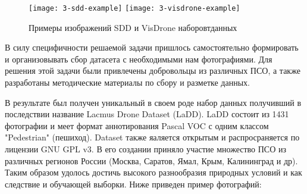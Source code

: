 \begin{figure}[H]
    \centering
    \texttt{[image: 3-sdd-example]}
    \hfill
    \texttt{[image: 3-visdrone-example]}
    \caption{Примеры изображений SDD и VisDrone наборовтданных} \label{sdd-visdrone-example}
\end{figure}


В силу специфичности решаемой задачи пришлось самостоятельно формировать и организовывать сбор датасета с необходимыми нам фотографиями. Для решения этой задачи были привлечены добровольцы из различных ПСО, а также разработаны методические материалы по сбору и разметке данных.

В результате был получен уникальный в своем роде набор данных получивший в последствии название Lacmus Drone Dataset (LaDD). LaDD состоит из 1431 фотографии и меет формат аннотирования Pascal VOC с одним классом "Pedestrian" (пешиход). Dataset также яаляется открытым и распросраняется по лицензии GNU GPL v3. В его создании приняло участие множество ПСО из различных регионов России (Москва, Саратов, Ямал, Крым, Калининград и др). Таким образом удолось достичь высокого разнообразия природных условий и как следствие и обучающей выборки. Ниже приведен пример фотографий:


\clearpage